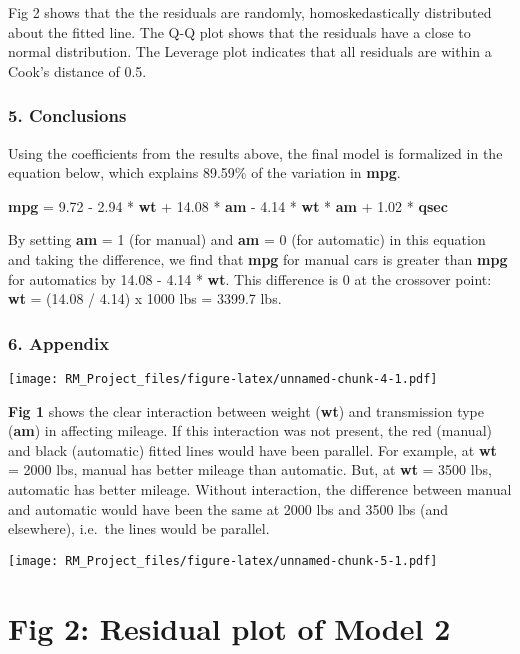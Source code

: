 \documentclass[10pt,]{article}
\begin{document}
Fig 2 shows that the the residuals are randomly, homoskedastically
distributed about the fitted line. The Q-Q plot shows that the residuals
have a close to normal distribution. The Leverage plot indicates that
all residuals are within a Cook's distance of 0.5.

\subsubsection{5. Conclusions}\label{conclusions}

Using the coefficients from the results above, the final model is
formalized in the equation below, which explains 89.59\% of the
variation in \textbf{mpg}.

\textbf{mpg} = 9.72 - 2.94 * \textbf{wt} + 14.08 * \textbf{am} - 4.14 *
\textbf{wt} * \textbf{am} + 1.02 * \textbf{qsec}

By setting \textbf{am} = 1 (for manual) and \textbf{am} = 0 (for
automatic) in this equation and taking the difference, we find that
\textbf{mpg} for manual cars is greater than \textbf{mpg} for automatics
by 14.08 - 4.14 * \textbf{wt}. This difference is 0 at the crossover
point: \textbf{wt} = (14.08 / 4.14) x 1000 lbs = 3399.7 lbs.

\newpage

\subsubsection{6. Appendix}\label{appendix}

\texttt{[image: RM\_Project\_files/figure-latex/unnamed-chunk-4-1.pdf]}

\textbf{Fig 1} shows the clear interaction between weight (\textbf{wt})
and transmission type (\textbf{am}) in affecting mileage. If this
interaction was not present, the red (manual) and black (automatic)
fitted lines would have been parallel. For example, at \textbf{wt} =
2000 lbs, manual has better mileage than automatic. But, at \textbf{wt}
= 3500 lbs, automatic has better mileage. Without interaction, the
difference between manual and automatic would have been the same at 2000
lbs and 3500 lbs (and elsewhere), i.e.~the lines would be parallel.

\texttt{[image: RM\_Project\_files/figure-latex/unnamed-chunk-5-1.pdf]}

\section{Fig 2: Residual plot of Model
2}\label{fig-2-residual-plot-of-model-2}
\end{document}
